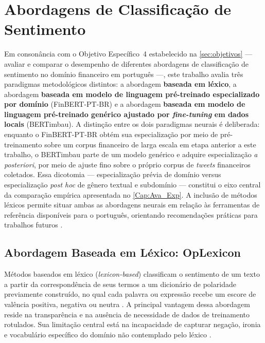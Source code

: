 
\section{Abordagens de Classificação de Sentimento}
\label{sec:abordagens}

Em consonância com o Objetivo Específico~4 estabelecido na \autoref{sec:objetivos} — avaliar e comparar o desempenho de diferentes abordagens de classificação de sentimento no domínio financeiro em português —, este trabalho avalia três paradigmas metodológicos distintos: a abordagem \textbf{baseada em léxico}, a abordagem \textbf{baseada em modelo de linguagem pré-treinado especializado por domínio} (FinBERT-PT-BR) e a abordagem \textbf{baseada em modelo de linguagem pré-treinado genérico ajustado por \textit{fine-tuning} em dados locais} (BERTimbau). A distinção entre os dois paradigmas neurais é deliberada: enquanto o FinBERT-PT-BR obtém sua especialização por meio de pré-treinamento sobre um corpus financeiro de larga escala em etapa anterior a este trabalho, o BERTimbau parte de um modelo genérico e adquire especialização \textit{a posteriori}, por meio de ajuste fino sobre o próprio corpus de \textit{tweets} financeiros coletados. Essa dicotomia --- especialização prévia de domínio versus especialização \textit{post hoc} de gênero textual e subdomínio --- constitui o eixo central da comparação empírica apresentada no \autoref{Cap:Ava_Exp}. A inclusão de métodos léxicos permite situar ambas as abordagens neurais em relação às ferramentas de referência disponíveis para o português, orientando recomendações práticas para trabalhos futuros \cite{kearney2014,sousa2025}.

\subsection{Abordagem Baseada em Léxico: OpLexicon}
\label{subsec:abordagem_lexica}

Métodos baseados em léxico (\textit{lexicon-based}) classificam o sentimento de um texto a partir da correspondência de seus termos a um dicionário de polaridade previamente construído, no qual cada palavra ou expressão recebe um escore de valência positiva, negativa ou neutra \cite{liu2020survey}. A principal vantagem dessa abordagem reside na transparência e na ausência de necessidade de dados de treinamento rotulados. Sua limitação central está na incapacidade de capturar negação,
ironia e vocabulário específico do domínio não contemplado pelo léxico \cite{loughran2011,kearney2014}.


